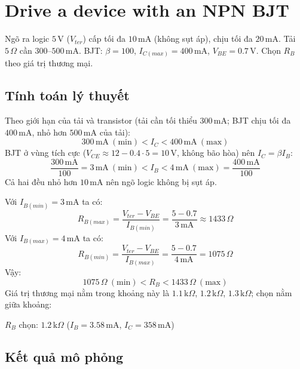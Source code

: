 \section{Drive a device with an NPN BJT}
Ngõ ra logic $5\,\text{V}$ ($V_{ter}$) cấp tối đa $10\,\text{mA}$ (không sụt áp), chịu tối đa $20\,\text{mA}$. Tải $5\,\Omega$ cần $300$--$500\,\text{mA}$. BJT: $\beta = 100$, $I_{C(max)} = 400\,\text{mA}$, $V_{BE} = 0.7\,\text{V}$. Chọn $R_B$ theo giá trị thương mại.


\subsection{Tính toán lý thuyết}
Theo giới hạn của tải và transistor (tải cần tối thiểu $300\,\text{mA}$; BJT chịu tối đa $400\,\text{mA}$, nhỏ hơn $500\,\text{mA}$ của tải):
\[ 300\,\text{mA}\ (\text{min}) < I_C < 400\,\text{mA}\ (\text{max}) \]
BJT ở vùng tích cực ($V_{CE} \approx 12 - 0.4\cdot 5 = 10\,\text{V}$, không bão hòa) nên $I_C = \beta I_B$:
\[ \frac{300\,\text{mA}}{100} = 3\,\text{mA}\ (\text{min}) < I_B < 4\,\text{mA}\ (\text{max}) = \frac{400\,\text{mA}}{100} \]
Cả hai đều nhỏ hơn $10\,\text{mA}$ nên ngõ logic không bị sụt áp.

Với $I_{B(min)} = 3\,\text{mA}$ ta có:
\[ R_{B(max)} = \frac{V_{ter} - V_{BE}}{I_{B(min)}} = \frac{5 - 0.7}{3\,\text{mA}} \approx 1433\,\Omega \]
Với $I_{B(max)} = 4\,\text{mA}$ ta có:
\[ R_{B(min)} = \frac{V_{ter} - V_{BE}}{I_{B(max)}} = \frac{5 - 0.7}{4\,\text{mA}} = 1075\,\Omega \]
Vậy:
\[ 1075\,\Omega\ (\text{min}) < R_B < 1433\,\Omega\ (\text{max}) \]
Giá trị thương mại nằm trong khoảng này là $1.1\,\text{k}\Omega$, $1.2\,\text{k}\Omega$, $1.3\,\text{k}\Omega$; chọn nằm giữa khoảng:

\begin{dapsobox}
$R_B$ chọn: $1.2\,\text{k}\Omega$ \quad ($I_B = 3.58\,\text{mA}$, $I_C = 358\,\text{mA}$)
\end{dapsobox}

\subsection{Kết quả mô phỏng}

